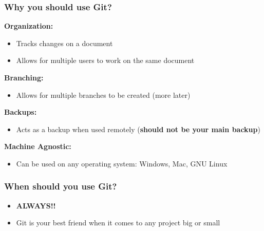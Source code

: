 \documentclass{beamer}
\begin{document}
\begin{frame}
	\frametitle{\textbf{Why you should use Git?}}
	
	\textbf{Organization:}
	\begin{itemize}
		\item Tracks changes on a document
		\item Allows for multiple users to work on the same document
	\end{itemize}

	\vspace{0.25cm}
	\textbf{Branching:}
	\begin{itemize}
		\item Allows for multiple branches to be created (more later)
	\end{itemize}

	\vspace{0.25cm}
	\textbf{Backups:}
	\begin{itemize}
		\item Acts as a backup when used remotely (\textbf{should not be your main backup})
	\end{itemize}

	\vspace{0.25cm}
	\textbf{Machine Agnostic:}
	\begin{itemize}
		\item Can be used on any operating system: Windows, Mac, GNU Linux
	\end{itemize}

\end{frame}


\begin{frame} 
	\frametitle{\textbf{When should you use Git?}}
	\begin{itemize}
		\item \textbf{ALWAYS!!}
		\item Git is your best friend when it comes to any project big or small  
	\end{itemize}
\end{frame}
\end{document}
